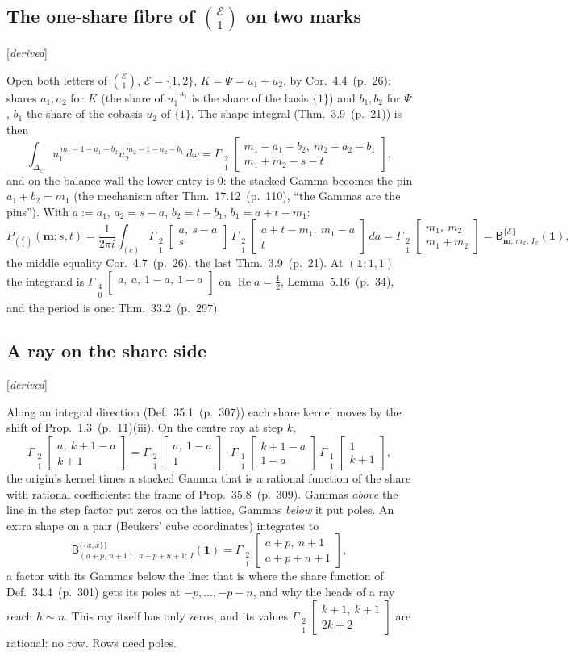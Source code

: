 \documentclass[11pt]{article}
\newcommand{\cE}{\mathcal E}
\newcommand{\one}{\mathbf 1}
\newcommand{\mvec}{\mathbf m}
\newcommand{\sB}{\mathsf B}
\newcommand{\Gst}[4]{\Gamma_{\substack{#1\\#2}}\!\begin{bmatrix}#3\\#4\end{bmatrix}}
\DeclareMathOperator{\re}{Re}
\newcommand{\status}[1]{\hfill{\small[\textit{#1}]}}
\newcommand{\hb}[2]{#1~(p.~#2)}   %
\theoremstyle{plain}
\theoremstyle{remark}
\begin{document}
\subsection{The one-share fibre of $\binom{\cE}1$ on two marks}\status{derived}

Open both letters of $\binom{\cE}{1}$, $\cE=\{1,2\}$, $K=\Psi=u_1+u_2$, by Cor.~\hb{4.4}{26}: shares $a_1,a_2$ for $K$ (the share of $u_1^{-a_1}$ is the share of the basis $\{1\}$) and $b_1,b_2$ for $\Psi$, $b_1$ the share of the cobasis $u_2$ of $\{1\}$. The shape integral (Thm.~\hb{3.9}{21}) is then
\[
\int_{\Delta_{\cE}}u_1^{\,m_1-1-a_1-b_2}u_2^{\,m_2-1-a_2-b_1}\,d\omega=\Gst{2}{1}{m_1-a_1-b_2,\ m_2-a_2-b_1}{m_1+m_2-s-t},
\]
and on the balance wall the lower entry is $0$: the stacked Gamma becomes the pin $a_1+b_2=m_1$ (the mechanism after Thm.~\hb{17.12}{110}, ``the Gammas are the pins''). With $a:=a_1$, $a_2=s-a$, $b_2=t-b_1$, $b_1=a+t-m_1$:
\[
P_{\binom{\cE}1}(\mvec;s,t)=\frac1{2\pi i}\int_{(c)}\Gst21{a,\ s-a}{s}\,\Gst21{a+t-m_1,\ m_1-a}{t}\,da
=\Gst21{m_1,\ m_2}{m_1+m_2}=\sB^{\{\cE\}}_{\mvec,\,m_{\cE};\,I_{\cE}}(\one),
\]
the middle equality Cor.~\hb{4.7}{26}, the last Thm.~\hb{3.9}{21}. At $(\one;1,1)$ the integrand is $\Gst40{a,\ a,\ 1-a,\ 1-a}{}$ on $\re a=\frac12$, Lemma~\hb{5.16}{34}, and the period is one: Thm.~\hb{33.2}{297}.

\subsection{A ray on the share side}\status{derived}

Along an integral direction (Def.~\hb{35.1}{307}) each share kernel moves by the shift of Prop.~\hb{1.3}{11}(iii). On the centre ray at step $k$,
\[
\Gst21{a,\ k+1-a}{k+1}=\Gst21{a,\ 1-a}{1}\cdot\Gst11{k+1-a}{1-a}\,\Gst11{1}{k+1},
\]
the origin's kernel times a stacked Gamma that is a rational function of the share with rational coefficients: the frame of Prop.~\hb{35.8}{309}. Gammas \emph{above} the line in the step factor put zeros on the lattice, Gammas \emph{below} it put poles. An extra shape on a pair (Beukers' cube coordinates) integrates to
\[
\sB^{\{\{x,\bar x\}\}}_{(a+p,\,n+1),\,a+p+n+1;\,I}(\one)=\Gst21{a+p,\ n+1}{a+p+n+1},
\]
a factor with its Gammas below the line: that is where the share function of Def.~\hb{34.4}{301} gets its poles at $-p,\dots,-p-n$, and why the heads of a ray reach $h\sim n$. This ray itself has only zeros, and its values $\Gst21{k+1,\ k+1}{2k+2}$ are rational: no row. Rows need poles.
\end{document}
